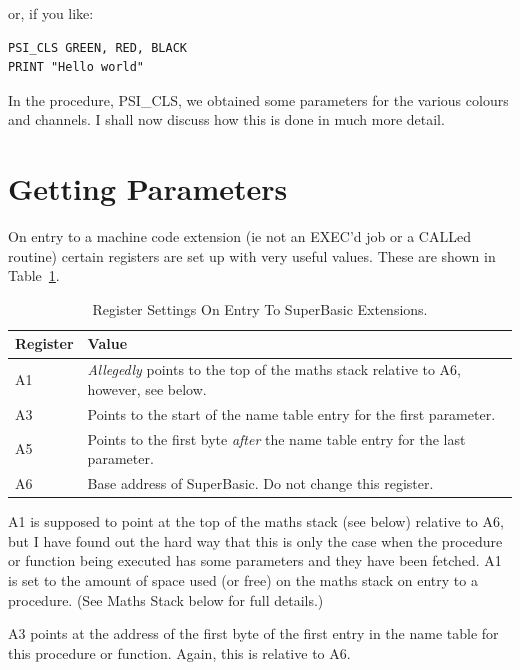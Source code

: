 or, if you like:

\begin{lstlisting}[firstnumber=1,]
PSI_CLS GREEN, RED, BLACK
PRINT "Hello world"
\end{lstlisting}

In the procedure, PSI\_CLS, we obtained some parameters for the
    various colours and channels. I shall now discuss how this is done in much
    more detail.

\section{Getting Parameters}
\label{ch7-parameters}%

On entry to a machine code extension (ie not an EXEC'd job or a
    CALLed routine) certain registers are set up with very useful values.
    These are shown in Table~\ref{tab:RegsitserSettingsOnEntryToSuperBasicExtensions}.
    
\begin{table}[htbp]
\centering
\begin{tabular}{l l}  %
\toprule
\textbf{Register} & \textbf{Value} \\
\midrule
%
A1 & \emph{Allegedly} points to the top of the maths stack relative to A6, however, see below.\\
A3 & Points to the start of the name table entry for the first parameter.\\
A5 & Points to the first byte \emph{after} the name table entry for the last parameter.\\
A6 & Base address of SuperBasic. Do not change this register.\\
%
\bottomrule
\end{tabular}
\caption{Register Settings On Entry To SuperBasic Extensions.}
\label{tab:RegsitserSettingsOnEntryToSuperBasicExtensions}
\end{table}

A1 is supposed to point at the top of the maths stack (see below)
    relative to A6, but I have found out the hard way that this is only the
    case when the procedure or function being executed has some parameters and
    they have been fetched. A1 is set to the amount of space used (or free) on
    the maths stack on entry to a procedure. (See Maths Stack below for full
    details.)

A3 points at the address of the first byte of the first entry in the
    name table for this procedure or function. Again, this is relative to
    A6.

